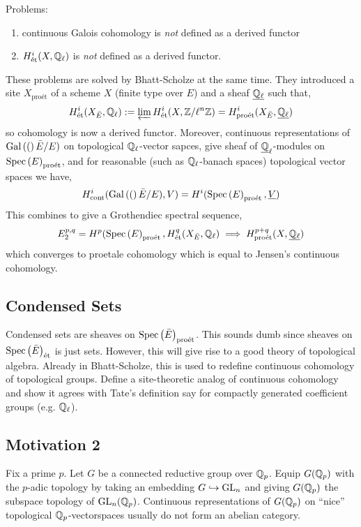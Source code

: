 \documentclass[12pt]{article}
\newcommand{\proet}{\text{pro\'{e}t}}
\renewcommand{\cont}{\text{cont}}
\begin{document}
Problems:
\begin{enumerate}
\item continuous Galois cohomology is \textit{not} defined as a derived functor

\item $H^i_{\text{\'{e}t}}(X, \mathbb{Q}_\ell)$ is \textit{not} defined as a derived functor.
\end{enumerate}
These problems are solved by Bhatt-Scholze at the same time. They introduced a site $X_{\proet}$ of a scheme $X$ (finite type over $E$) and a sheaf $\underline{\mathbb{Q}_\ell}$ such that,
\[ H^i_{\et}(X_{\bar{E}}, \Q_\ell) := \ilim H^i_{\et}(X, \Z / \ell^n \Z) = H^i_{\proet}(X_{\bar{E}}, \underline{\Q_\ell}) \]
so \etale cohomology is now a derived functor. Moreover, continuous representations of $\mathrm{Gal}\left( ( \right)\bar{E}/E)$ on topological $\mathbb{Q}_\ell$-vector sapces, give sheaf of $\underline{\mathbb{Q}}_\ell$-modules on $\Spec{E}_{\proet}$, and for reasonable (such as $\mathbb{Q}_\ell$-banach spaces) topological vector spaces we have,
\[ H^i_{\cont}(\Gal(\bar{E}/E), V) = H^i(\Spec{E}_{\proet}, \underline{V}) \]
This combines to give a Grothendiec spectral sequence,
\[ E^{p,q}_2 = H^p(\Spec{E}_{\proet}, H^q_{\et}(X_{\bar{E}}, \QQ_\ell) \implies H^{p+q}_{\proet}(X, \underline{\QQ_\ell}) \]
which converges to proetale cohomology which is equal to Jensen's continuous cohomology. 

\subsection{Condensed Sets}

Condensed sets are sheaves on $\Spec{\bar{E}}_{\proet}$. This sounds dumb since sheaves on $\mathrm{Spec}\left( \bar{E} \right)_{\text{\'{e}t}}$ is just sets. However, this will give rise to a good theory of topological algebra. Already in Bhatt-Scholze, this is used to redefine continuous cohomology of topological groups. Define a site-theoretic analog of continuous cohomology and show it agrees with Tate's definition say for compactly generated coefficient groups (e.g. $\mathbb{Q}_\ell$). 

\subsection{Motivation 2}

Fix a prime $p$. Let $G$ be a connected reductive group over $\mathbb{Q}_p$. Equip $G(\mathbb{Q}_p)$ with the $p$-adic topology by taking an embedding $G \hookrightarrow \mathrm{GL}_n$ and giving $G(\mathbb{Q}_p)$ the subspace topology of $\mathrm{GL}_n(\mathbb{Q}_p)$. Continuous representations of $G(\mathbb{Q}_p)$ on ``nice'' topological $\mathbb{Q}_p$-vectorspaces usually do not form an abelian category. 
\end{document}
